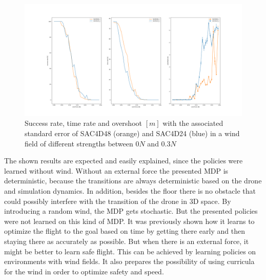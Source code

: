 \newpage
\begin{figure}
	\centering
	\includegraphics[width=\linewidth]{figures/windsuc.png}
	\caption{Success rate, time rate and overshoot $[m]$ with the associated standard error
	of SAC4D48 (orange) and SAC4D24 (blue) in a wind field of different strengths between $0N$ and $0.3N$}
	\label{fig:succ}
\end{figure}
The shown results are expected and easily explained, since the policies were learned without wind.
Without an external force the presented MDP is deterministic, because the transitions are always deterministic based
on the drone and simulation dynamics. In addition, besides the floor there is no obstacle that could 
possibly interfere with the transition of the drone in 3D space.
By introducing a random wind, the MDP gets stochastic. But the presented policies were not 
learned on this kind of MDP. It was previously shown how it learns to optimize 
the flight to the goal based on time by getting there early and then staying there as accurately as possible.
But when there is an external force, it might be better to learn safe flight.
This can be achieved by learning policies on environments with wind fields.
It also prepares the possibility of using curricula for the wind in order to optimize safety and speed.
 








